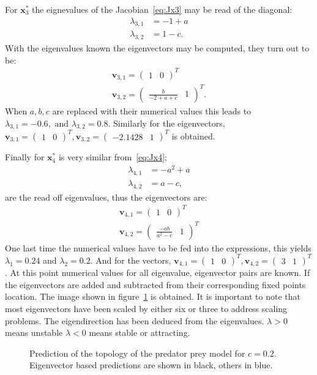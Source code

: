 For $\mathbf{x}_3^*$ the eignevalues of the Jacobian~\ref{eq:Jx3} may be read of the diagonal:
\begin{align}
\lambda_{3,1} &= -1+a \\
\lambda_{3,2} &= 1-c. 
\end{align}
With the eigenvalues known the eigenvectors may be  computed, they turn out to be:
\begin{align}
 \mathbf{v}_{3,1} = \begin{pmatrix} 1 & 0 \end{pmatrix}^T \\
\mathbf{v}_{3,2} = \begin{pmatrix}  \frac{b}{-2+a+c} & 1 \end{pmatrix}^T.
\end{align}
When $a,b,c$ are replaced with their numerical values this leads to $\lambda_{3,1} = -0.6, \text{ and } \lambda_{3,2} = 0.8 $. Similarly for the eigenvectors, $\mathbf{v}_{3,1} = \begin{pmatrix} 1 & 0 \end{pmatrix}^T,
\mathbf{v}_{3,2} = \begin{pmatrix} -2.1428& 1 \end{pmatrix}^T$ is obtained. 

Finally for $\mathbf{x}_4^*$ is very similar from~\ref{eq:Jx4};
\begin{align}
\lambda_{4,1} &= -a^2 + a \\
\lambda_{4,2} &= a-c,
\end{align}
are the read off eigenvalues, thus the eigenvectors are:
\begin{align}
 \mathbf{v}_{4,1} = \begin{pmatrix} 1 & 0 \end{pmatrix}^T \\
 \mathbf{v}_{4,2} = \begin{pmatrix} \frac{-ab}{a^2-c} & 1 \end{pmatrix}^T
\end{align}
One last time the numerical values have to be fed into the expressions, this yields $\lambda_1 = 0.24$ and $\lambda_2 = 0.2$. And for the vectors, $ \mathbf{v}_{4,1} = \begin{pmatrix} 1 & 0 \end{pmatrix}^T,
 \mathbf{v}_{4,2} = \begin{pmatrix} 3 & 1 \end{pmatrix}^T$. At this point numerical values for all eigenvalue, eigenvector pairs are known. If the eigenvectors are added and subtracted from their corresponding fixed points location. The image shown in figure~\ref{fig:Top} is obtained. It is important to note that most eigenvectors have been scaled by either six or three to address scaling problems. The eigendirection has been deduced from the eigenvalues. $\lambda > 0$ means unstable $\lambda < 0$ means stable or attracting.

\begin{figure}
\centering

\caption{Prediction of the topology of the predator prey model for $c = 0.2$. Eigenvector based predictions are shown in black, others in blue.}
\label{fig:Top}
\end{figure}



